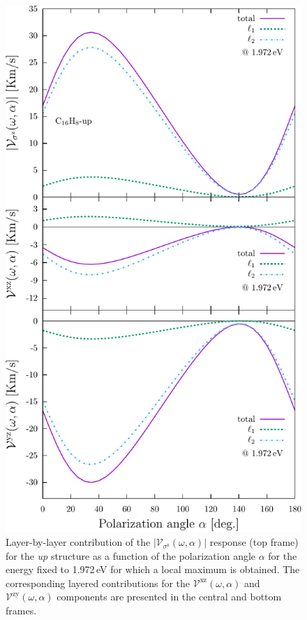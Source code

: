 \documentclass[prb,11pt,tightenlines,twocolumn,aps]{revtex4-1}
\begin{document}
\begin{figure}[t]
    \centering
    \includegraphics[width=\linewidth]{upplots/up-svaz-lay-2}
    
    \caption{Layer-by-layer contribution of the
    $|\mathcal{V}_{\sigma^{\mathrm{z}}}(\omega,\alpha)|$ response (top frame)
    for the \emph{up} structure as a function of the polarization angle
    $\alpha$ for the energy fixed to 1.972\,eV for which a local maximum is
    obtained.
    The corresponding layered contributions for the
    $\mathcal{V}^{\mathrm{xz}}(\omega,\alpha)$ and
    $\mathcal{V}^{\mathrm{zy}}(\omega,\alpha)$ components are presented in the
    central and bottom frames.}
    \label{fig:up-vsz-lay-2}
\end{figure}
\end{document}
